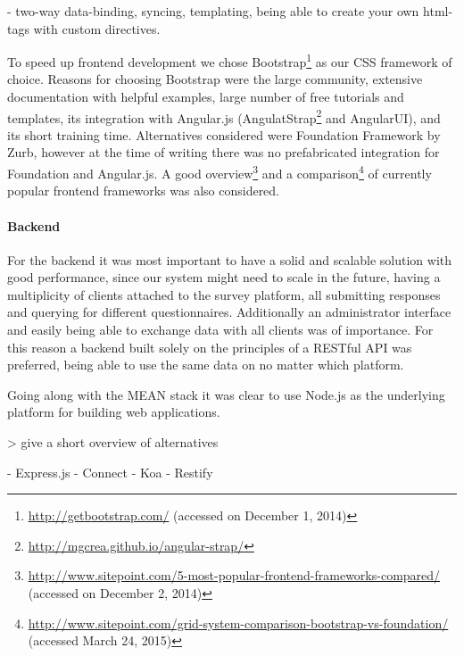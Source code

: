 {		%
			- two-way data-binding, syncing, templating, being able to create your own html-tags with custom directives.

		To speed up frontend development we chose Bootstrap\footnote{\url{http://getbootstrap.com/} (accessed on December 1, 2014)} as our CSS framework of choice. Reasons for choosing Bootstrap were the large community, extensive documentation with helpful examples, large number of free tutorials and templates, its integration with Angular.js (AngulatStrap\footnote{\url{http://mgcrea.github.io/angular-strap/}} and AngularUI), and its short training time.
		Alternatives considered were Foundation Framework by Zurb, however at the time of writing there was no prefabricated integration for Foundation and Angular.js.
		A good overview\footnote{\url{http://www.sitepoint.com/5-most-popular-frontend-frameworks-compared/} (accessed on December 2, 2014)} and a comparison\footnote{\url{http://www.sitepoint.com/grid-system-comparison-bootstrap-vs-foundation/} (accessed March 24, 2015)} of currently popular frontend frameworks was also considered.

	


	\paragraph{Backend}

		For the backend it was most important to have a solid and scalable solution with good performance, since our system might need to scale in the future, having a multiplicity of clients attached to the survey platform, all submitting responses and querying for different questionnaires. Additionally an administrator interface and easily being able to exchange data with all clients was of importance. For this reason a backend built solely on the principles of a RESTful API was preferred, being able to use the same data on no matter which platform.


		Going along with the MEAN stack it was clear to use Node.js as the underlying platform for building web applications. 

		> give a short overview of alternatives

		 - Express.js
		 - Connect
		 - Koa
		 - Restify


}
